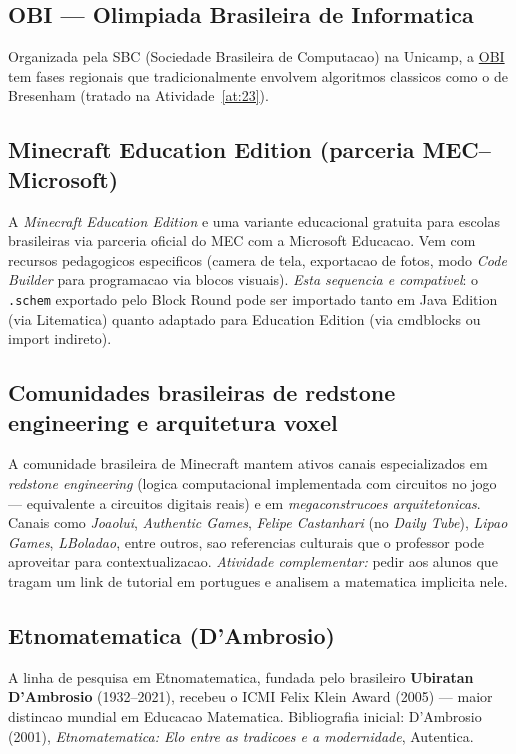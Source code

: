 \documentclass[12pt,a4paper]{scrartcl}
\newcommand{\acc}[1]{\textcolor{accent}{\textbf{#1}}}
\begin{document}
\subsection{OBI --- Olimpiada Brasileira de Informatica}

Organizada pela SBC (Sociedade Brasileira de Computacao) na Unicamp, a \href{https://olimpiada.ic.unicamp.br/}{OBI} tem fases regionais que tradicionalmente envolvem algoritmos classicos como o de Bresenham (tratado na Atividade~\ref{at:23}).

\subsection{Minecraft Education Edition (parceria MEC--Microsoft)}\label{sec:mee}

A \emph{Minecraft Education Edition} e uma variante educacional gratuita para escolas brasileiras via parceria oficial do MEC com a Microsoft Educacao. Vem com recursos pedagogicos especificos (camera de tela, exportacao de fotos, modo \emph{Code Builder} para programacao via blocos visuais). \emph{Esta sequencia e compativel}: o \texttt{.schem} exportado pelo Block Round pode ser importado tanto em Java Edition (via Litematica) quanto adaptado para Education Edition (via cmdblocks ou import indireto).

\subsection{Comunidades brasileiras de redstone engineering e arquitetura voxel}

A comunidade brasileira de Minecraft mantem ativos canais especializados em \emph{redstone engineering} (logica computacional implementada com circuitos no jogo --- equivalente a circuitos digitais reais) e em \emph{megaconstrucoes arquitetonicas}. Canais como \emph{Joaolui}, \emph{Authentic Games}, \emph{Felipe Castanhari} (no \emph{Daily Tube}), \emph{Lipao Games}, \emph{LBoladao}, entre outros, sao referencias culturais que o professor pode aproveitar para contextualizacao. \emph{Atividade complementar:} pedir aos alunos que tragam um link de tutorial em portugues e analisem a matematica implicita nele.

\subsection{Etnomatematica (D'Ambrosio)}

A linha de pesquisa em Etnomatematica, fundada pelo brasileiro \acc{Ubiratan D'Ambrosio} (1932--2021), recebeu o ICMI Felix Klein Award (2005) --- maior distincao mundial em Educacao Matematica. Bibliografia inicial: D'Ambrosio (2001), \emph{Etnomatematica: Elo entre as tradicoes e a modernidade}, Autentica.
\end{document}
